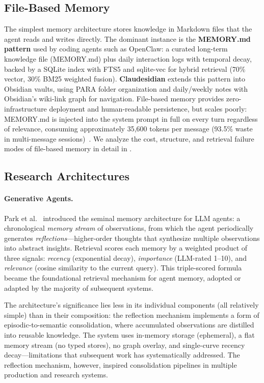 \subsection{File-Based Memory}
\label{sec:filebased}

The simplest memory architecture stores knowledge in Markdown files
that the agent reads and writes directly. The dominant instance is the
\textbf{MEMORY.md pattern} used by coding agents such as OpenClaw:
a curated long-term knowledge file (MEMORY.md) plus daily interaction
logs with temporal decay, backed by a SQLite index with FTS5 and
sqlite-vec for hybrid retrieval (70\% vector, 30\% BM25 weighted
fusion). \textbf{Claudesidian} extends this pattern into Obsidian
vaults, using PARA folder organization and daily/weekly notes with
Obsidian's wiki-link graph for navigation. File-based memory provides
zero-infrastructure deployment and human-readable persistence, but
scales poorly: MEMORY.md is injected into the system prompt in full
on every turn regardless of relevance, consuming approximately 35,600
tokens per message (93.5\% waste in multi-message
sessions)~\cite{openclaw9157}. We analyze the cost, structure, and
retrieval failure modes of file-based memory in detail in
.

\subsection{Research Architectures}
\label{sec:research}

\paragraph{Generative Agents.}
Park et al.~\cite{park2023generative} introduced the seminal memory
architecture for LLM agents: a chronological \emph{memory stream} of
observations, from which the agent periodically generates
\emph{reflections}---higher-order thoughts that synthesize multiple
observations into abstract insights. Retrieval scores each memory by a
weighted product of three signals: \emph{recency} (exponential decay),
\emph{importance} (LLM-rated 1--10), and \emph{relevance} (cosine
similarity to the current query). This triple-scored formula became the
foundational retrieval mechanism for agent memory, adopted or adapted
by the majority of subsequent systems.

The architecture's significance lies less in its individual components
(all relatively simple) than in their composition: the reflection
mechanism implements a form of episodic-to-semantic consolidation,
where accumulated observations are distilled into reusable knowledge.
The system uses in-memory storage (ephemeral), a flat memory stream
(no typed stores), no graph overlay, and single-curve recency
decay---limitations that subsequent work has systematically addressed.
The reflection mechanism, however, inspired consolidation pipelines
in multiple production and research systems.

